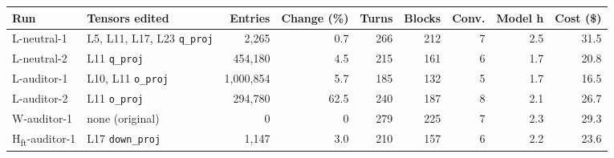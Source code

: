 \begin{tabular}{@{}llrrrrrrr@{}}
\toprule
Run & Tensors edited & Entries & Change (\%) & Turns & Blocks & Conv. & Model h & Cost (\$) \\
\midrule
L-neutral-1 & L5, L11, L17, L23 \texttt{q\_proj} & 2{,}265 & 0.7 & 266 & 212 & 7 & 2.5 & 31.5 \\
L-neutral-2 & L11 \texttt{q\_proj} & 454{,}180 & 4.5 & 215 & 161 & 6 & 1.7 & 20.8 \\
L-auditor-1 & L10, L11 \texttt{o\_proj} & 1{,}000{,}854 & 5.7 & 185 & 132 & 5 & 1.7 & 16.5 \\
L-auditor-2 & L11 \texttt{o\_proj} & 294{,}780 & 62.5 & 240 & 187 & 8 & 2.1 & 26.7 \\
W-auditor-1 & none (original) & 0 & 0 & 279 & 225 & 7 & 2.3 & 29.3 \\
H\textsubscript{ft}-auditor-1 & L17 \texttt{down\_proj} & 1{,}147 & 3.0 & 210 & 157 & 6 & 2.2 & 23.6 \\
\bottomrule
\end{tabular}
